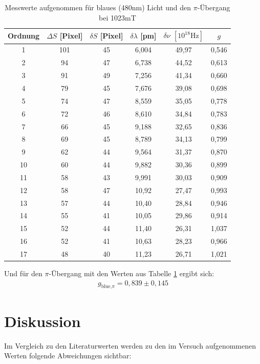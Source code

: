 \begin{table}[htbp]
    \begin{tabular}{|c|c|c|c|c|c|}
        Ordnung & $\Delta S$ [Pixel]    & $\delta S$ [Pixel]    &$\delta \lambda$ [pm]  & $\delta \nu$ $[10^{18}\text{Hz}]$ &   $g$\\\hline
        1&  101&   45&  6,004&  49,97&  0,546\\\hline
        2&  94& 47& 6,738&  44,52&  0,613\\\hline
        3&  91& 49& 7,256&  41,34&  0,660\\\hline
        4&  79& 45& 7,676&  39,08&  0,698\\\hline
        5&  74& 47& 8,559&  35,05&  0,778\\\hline
        6&  72& 46& 8,610&  34,84&  0,783\\\hline
        7&  66& 45& 9,188&  32,65&  0,836\\\hline
        8&  69& 45& 8,789&  34,13&  0,799\\\hline
        9&  62& 44& 9,564&  31,37&  0,870\\\hline
        10& 60& 44& 9,882&  30,36&  0,899\\\hline
        11& 58& 43& 9,991&  30,03&  0,909\\\hline
        12& 58& 47& 10,92&  27,47&  0,993\\\hline
        13& 57& 44& 10,40&  28,84&  0,946\\\hline
        14& 55& 41& 10,05&  29,86&  0,914\\\hline
        15& 52& 44& 11,40&  26,31&  1,037\\\hline
        16& 52& 41& 10,63&  28,23&  0,966\\\hline
        17& 48& 40& 11,23&  26,71&  1,021\\\hline
    \end{tabular}
    \caption{Messwerte aufgenommen für blaues (480nm) Licht und den $\pi$-Übergang bei 1023mT}
    \label{tab_blue_pi}
\end{table}

Und für den $\pi$-Übergang mit den Werten aus Tabelle \ref{tab_blue_pi} ergibt sich:
\begin{align*}
g_{\text{blue,}\pi}=0,839\pm0,145
\end{align*}

\section{Diskussion}
Im Vergleich zu den Literaturwerten werden zu den im Versuch aufgenommenen Werten folgende Abweichungen sichtbar:


